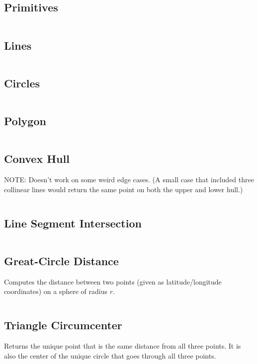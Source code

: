 \documentclass[9pt,a4paper,twocolumn,landscape,oneside]{amsart}
\newcommand{\code}[1]{\inputminted{cpp}{_code/#1}}
\newif\ifverbose
\begin{document}
    \subsection{Primitives}
        \ifverbose
        Geometry primitives.
        \fi
        \code{geometry/primitives.cpp}
    \subsection{Lines}
        \ifverbose
        Line related functions.
        \fi
        \code{geometry/lines.cpp}
    \subsection{Circles}
        \ifverbose
        Circle related functions.
        \fi
        \code{geometry/circles.cpp}

    \subsection{Polygon}
        \ifverbose
        Polygon primitives.
        \fi
        \code{geometry/polygon.cpp}

    \subsection{Convex Hull}
        \ifverbose
        An algorithm that finds the Convex Hull of a set of points.
        \fi
        NOTE: Doesn't work on some weird edge cases. (A small case that
        included three collinear lines would return the same point on both the
        upper and lower hull.)
        \code{geometry/convex_hull.cpp}

    \subsection{Line Segment Intersection}
        \ifverbose
        Computes the intersection between two line segments.
        \fi
        \code{geometry/line_segment_intersect.cpp}

    \subsection{Great-Circle Distance}
        Computes the distance between two points (given as latitude/longitude
        coordinates) on a sphere of radius $r$.
        \code{geometry/gc_distance.cpp}

    \subsection{Triangle Circumcenter}
        Returns the unique point that is the same distance from all three
        points. It is also the center of the unique circle that goes through
        all three points.
        \code{geometry/circumcenter.cpp}
\end{document}

